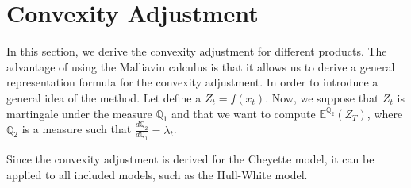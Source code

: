 \documentclass[a4paper,10pt]{article}
\newcommand{\1}{\mathbf{1}}
\begin{document}
 

\section{Convexity Adjustment}\label{sec:CA}
In this section, we derive the convexity adjustment for different products. The advantage of using the Malliavin calculus is that it allows us to derive a general representation formula for the convexity adjustment. In order to introduce a general idea of the method. Let define a $Z_t = f(x_t)$. Now, we suppose that $Z_t$ is martingale under the measure $\mathbb{Q}_1$ and that we want to compute $\mathbb{E}^{\mathbb{Q}_2}\left(Z_T \right)$, where $\mathbb{Q}_2$ is a measure such that $\frac{d\mathbb{Q}_2}{d\mathbb{Q}_1} = \lambda_t$. 




Since the convexity adjustment is derived for the Cheyette model, it can be applied to all included models, such as the Hull-White model.
\end{document}
